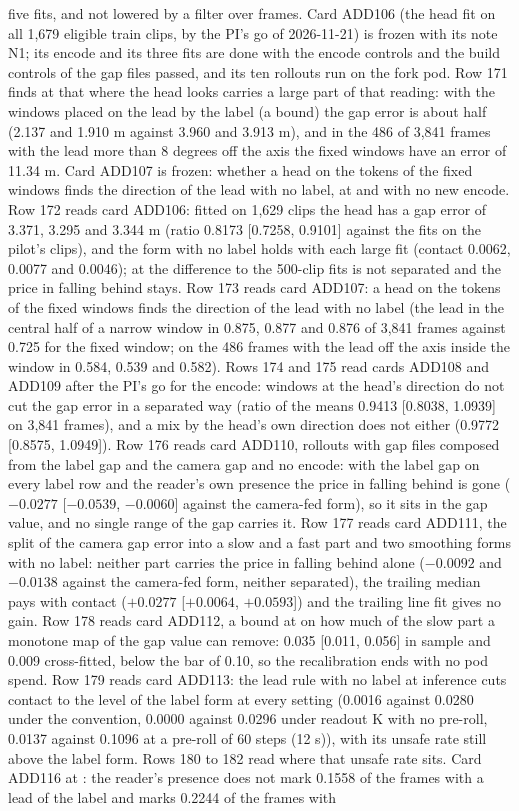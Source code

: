 five fits, and not lowered by a filter over frames. Card ADD106 (the head fit on all 1,679 eligible train clips, by the PI's go of 2026-11-21) is frozen with its note N1; its encode and its three fits are done with the encode controls and the build controls of the gap files passed, and its ten rollouts run on the fork pod. Row 171 finds at  that where the head looks carries a large part of that reading: with the windows placed on the lead by the label (a bound) the gap error is about half (2.137 and 1.910 m against 3.960 and 3.913 m), and in the 486 of 3,841 frames with the lead more than 8 degrees off the axis the fixed windows have an error of 11.34 m. Card ADD107 is frozen: whether a head on the tokens of the fixed windows finds the direction of the lead with no label, at  and with no new encode. Row 172 reads card ADD106: fitted on 1,629 clips the head has a gap error of 3.371, 3.295 and 3.344 m (ratio 0.8173 [0.7258, 0.9101] against the fits on the pilot's clips), and the form with no label holds with each large fit (contact 0.0062, 0.0077 and 0.0046); at  the difference to the 500-clip fits is not separated and the price in falling behind stays. Row 173 reads card ADD107: a head on the tokens of the fixed windows finds the direction of the lead with no label (the lead in the central half of a narrow window in 0.875, 0.877 and 0.876 of 3,841 frames against 0.725 for the fixed window; on the 486 frames with the lead off the axis inside the window in 0.584, 0.539 and 0.582). Rows 174 and 175 read cards ADD108 and ADD109 after the PI's go for the encode: windows at the head's direction do not cut the gap error in a separated way (ratio of the means 0.9413 [0.8038, 1.0939] on 3,841 frames), and a mix by the head's own direction does not either (0.9772 [0.8575, 1.0949]). Row 176 reads card ADD110, rollouts with gap files composed from the label gap and the camera gap and no encode: with the label gap on every label row and the reader's own presence the price in falling behind is gone ($-0.0277$ [$-0.0539$, $-0.0060$] against the camera-fed form), so it sits in the gap value, and no single range of the gap carries it. Row 177 reads card ADD111, the split of the camera gap error into a slow and a fast part and two smoothing forms with no label: neither part carries the price in falling behind alone ($-0.0092$ and $-0.0138$ against the camera-fed form, neither separated), the trailing median pays with contact ($+0.0277$ [$+0.0064$, $+0.0593$]) and the trailing line fit gives no gain. Row 178 reads card ADD112, a bound at  on how much of the slow part a monotone map of the gap value can remove: 0.035 [0.011, 0.056] in sample and 0.009 cross-fitted, below the bar of 0.10, so the recalibration ends with no pod spend. Row 179 reads card ADD113: the lead rule with no label at inference cuts contact to the level of the label form at every setting (0.0016 against 0.0280 under the convention, 0.0000 against 0.0296 under readout K with no pre-roll, 0.0137 against 0.1096 at a pre-roll of 60 steps (12 s)), with its unsafe rate still above the label form. Rows 180 to 182 read where that unsafe rate sits. Card ADD116 at : the reader's presence does not mark 0.1558 of the frames with a lead of the label and marks 0.2244 of the frames with 